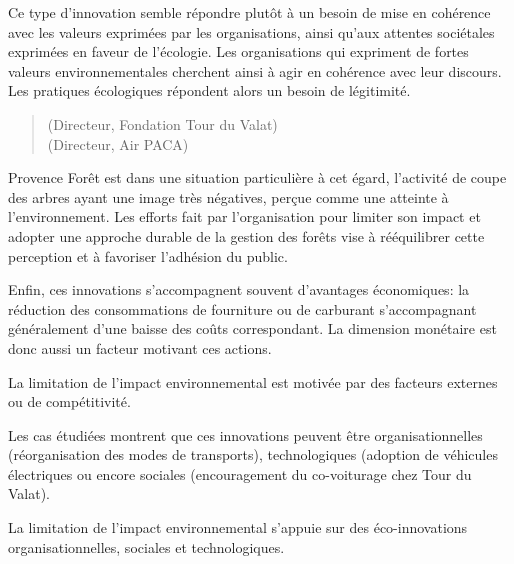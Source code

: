            Ce type d'innovation semble répondre plutôt à un besoin de mise en cohérence avec les valeurs exprimées par les organisations, ainsi qu'aux attentes sociétales exprimées en faveur de l'écologie. Les organisations qui expriment de fortes valeurs environnementales cherchent ainsi à agir en cohérence avec leur discours. Les pratiques écologiques répondent alors un besoin de légitimité. 
            \begin{quotation}
                 (Directeur, Fondation Tour du Valat) \\
                 (Directeur, Air PACA)
            \end{quotation}
            Provence Forêt est dans une situation particulière à cet égard, l'activité de coupe des arbres ayant une image très négatives, perçue comme une atteinte à l'environnement. Les efforts fait par l'organisation pour limiter son impact et adopter une approche durable de la gestion des forêts vise à rééquilibrer cette perception et à favoriser l'adhésion du public. 
            
            Enfin, ces innovations s'accompagnent souvent d'avantages économiques: la réduction des consommations de fourniture ou de carburant s'accompagnant généralement d'une baisse des coûts correspondant. La dimension monétaire est donc aussi un facteur motivant ces actions. 

            \begin{hyp}
                \label{prop:A}
                La limitation de l'impact environnemental est motivée par des facteurs externes ou de compétitivité.
            \end{hyp}
            
            Les cas étudiées montrent que ces innovations peuvent être organisationnelles (réorganisation des modes de transports), technologiques (adoption de véhicules électriques ou encore sociales (encouragement du co-voiturage chez Tour du Valat).
            
            \begin{hyp}
            \label{prop:B}
                La limitation de l'impact environnemental s'appuie sur des éco-innovations organisationnelles, sociales et technologiques.
            \end{hyp}
        
